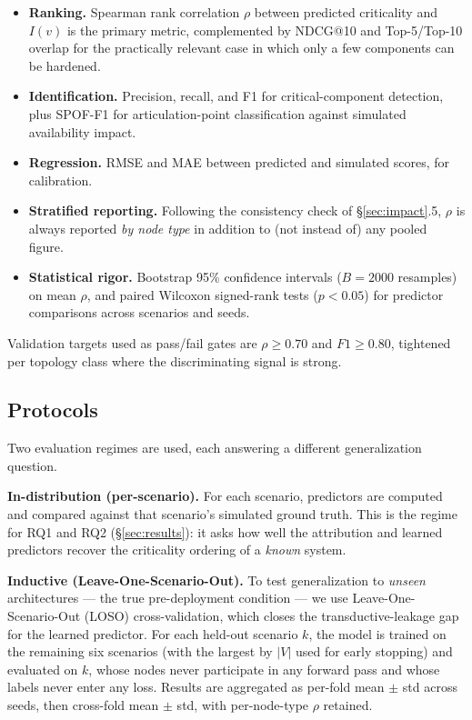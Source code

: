 \documentclass[review]{elsarticle}
\begin{document}
\begin{itemize}
\item \textbf{Ranking.} Spearman rank correlation $\rho$ between predicted criticality and $I(v)$ is
  the primary metric, complemented by NDCG@10 and Top-5/Top-10 overlap for the practically relevant
  case in which only a few components can be hardened.
\item \textbf{Identification.} Precision, recall, and F1 for critical-component detection, plus
  SPOF-F1 for articulation-point classification against simulated availability impact.
\item \textbf{Regression.} RMSE and MAE between predicted and simulated scores, for calibration.
\item \textbf{Stratified reporting.} Following the consistency check of \S\ref{sec:impact}.5, $\rho$
  is always reported \emph{by node type} in addition to (not instead of) any pooled figure.
\item \textbf{Statistical rigor.} Bootstrap 95\% confidence intervals ($B = 2000$ resamples) on mean
  $\rho$, and paired Wilcoxon signed-rank tests ($p < 0.05$) for predictor comparisons across
  scenarios and seeds.
\end{itemize}

Validation targets used as pass/fail gates are $\rho \ge 0.70$ and $F1 \ge 0.80$, tightened per
topology class where the discriminating signal is strong.

\subsection{Protocols}

Two evaluation regimes are used, each answering a different generalization question.

\textbf{In-distribution (per-scenario).} For each scenario, predictors are computed and compared
against that scenario's simulated ground truth. This is the regime for RQ1 and RQ2
(\S\ref{sec:results}): it asks how well the attribution and learned predictors recover the
criticality ordering of a \emph{known} system.

\textbf{Inductive (Leave-One-Scenario-Out).} To test generalization to \emph{unseen} architectures
--- the true pre-deployment condition --- we use Leave-One-Scenario-Out (LOSO) cross-validation,
which closes the transductive-leakage gap for the learned predictor. For each held-out scenario $k$,
the model is trained on the remaining six scenarios (with the largest by $|V|$ used for early
stopping) and evaluated on $k$, whose nodes never participate in any forward pass and whose labels
never enter any loss. Results are aggregated as per-fold mean $\pm$ std across seeds, then
cross-fold mean $\pm$ std, with per-node-type $\rho$ retained.
\end{document}
